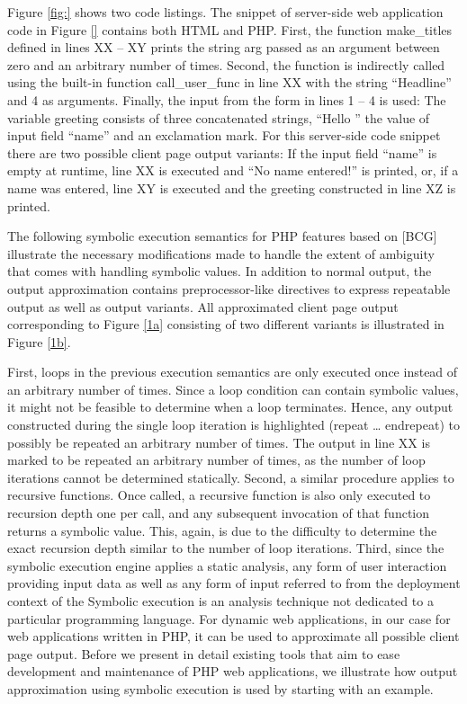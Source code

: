 \documentclass[preprint]{sig-alternate-05-2015}
\begin{document}
Figure \ref{fig:} shows two code listings. The snippet of server-side web application code in Figure \ref{} contains both HTML and PHP. First, the function make\_titles defined in lines XX – XY prints the string arg passed as an argument between zero and an arbitrary number of times. Second, the function is indirectly called using the built-in function call\_user\_func in line XX with the string “Headline” and 4 as arguments.  Finally, the input from the form in lines 1 – 4 is used: The variable greeting consists of three concatenated strings, “Hello ” the value of input field “name” and an exclamation mark. For this server-side code snippet there are two possible client page output variants: If the input field “name” is empty at runtime, line XX is executed and “No name entered!” is printed, or, if a name was entered, line XY is executed and the greeting constructed in line XZ is printed.

The following symbolic execution semantics for PHP features  based on [BCG] illustrate the necessary modifications made to handle the extent of ambiguity that comes with handling symbolic values. In addition to normal output, the output approximation contains preprocessor-like directives to express repeatable output as well as output variants. All approximated client page output corresponding to Figure \ref{1a} consisting of two different variants is illustrated in Figure \ref{1b}. 

First, loops in the previous execution semantics are only executed once instead of an arbitrary number of times. Since a loop condition can contain symbolic values, it might not be feasible to determine when a loop terminates. Hence, any output constructed during the single loop iteration is highlighted (repeat … endrepeat) to possibly be repeated an arbitrary number of times. The output in line XX is marked to be repeated an arbitrary number of times, as the number of loop iterations cannot be determined statically. Second, a similar procedure applies to recursive functions. Once called, a recursive function is  also only executed to recursion depth one per call, and any subsequent invocation of that function returns a symbolic value. This, again, is due to the difficulty to determine the exact recursion depth similar to the number of loop iterations. Third, since the symbolic execution engine applies a static analysis, any form of user interaction providing input data as well as any form of input referred to from the deployment context of the 
Symbolic execution is an analysis technique not dedicated to a particular programming language. For dynamic web applications, in our case for web applications written in PHP, it can be used to approximate all possible client page output. Before we present in detail existing tools that aim to ease development and maintenance of PHP web applications, we illustrate how output approximation using symbolic execution is used by starting with an example.
\end{document}

